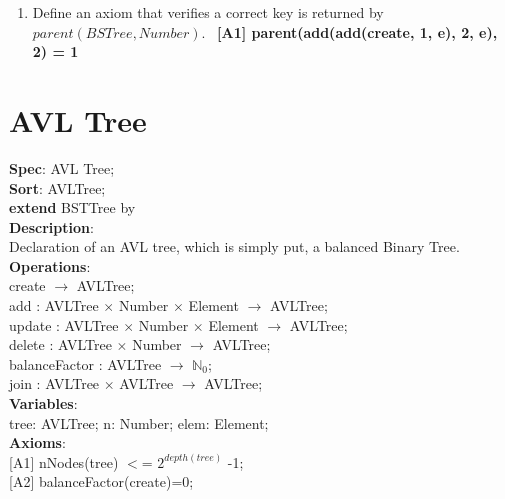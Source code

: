 \documentclass[12pt]{article}
\begin{document}
\begin{spacing}{1.5}
\begin{enumerate}
\item Define an axiom that verifies a correct key is returned by $parent(BSTree, Number)$.\
\hspace*{5mm} \textbf{[A1] parent(add(add(create, 1, e), 2, e), 2) = 1}
\

\end{enumerate}

\newpage

\section*{AVL Tree}

\noindent \textbf{Spec}: AVL Tree;\\
\noindent \textbf{Sort}: AVLTree;\\
\noindent \textbf{extend} BSTTree by\\
\noindent \textbf{Description}:\\Declaration of an AVL tree, which is simply put, a balanced Binary Tree.\\
\noindent \textbf{Operations}:\\
\hspace*{5mm} create $\rightarrow$ AVLTree;\\
\hspace*{5mm} add : AVLTree $\times$ Number $\times$ Element $\rightarrow$ AVLTree;\\
\hspace*{5mm} update : AVLTree $\times$ Number $\times$ Element $\rightarrow$ AVLTree;\\
\hspace*{5mm} delete : AVLTree $\times$ Number $\rightarrow$ AVLTree;\\
\hspace*{5mm} balanceFactor :  AVLTree $\rightarrow$ $\mathbb{N}_0$;\\
\hspace*{5mm} join : AVLTree $\times$ AVLTree $\rightarrow$ AVLTree;\\
\noindent \textbf{Variables}:\\
\hspace*{5mm} tree: AVLTree; n: Number; elem: Element;\\
\noindent \textbf{Axioms}:\\
\hspace*{5mm} [A1] nNodes(tree) $<$= $2^{depth(tree)}$ -1;\\
\hspace*{5mm} [A2] balanceFactor(create)=0;\\

\end{spacing}
\end{document}
